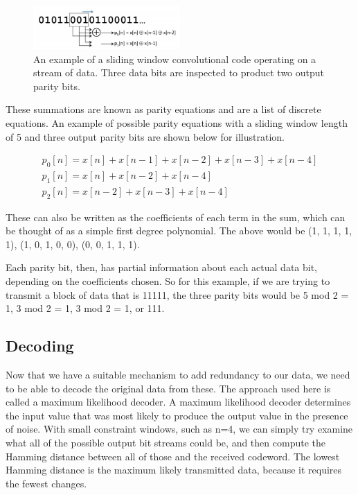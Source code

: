 \documentclass[12pt]{article}
\begin{document}
\begin{figure}[h!]
 \centering
 \includegraphics[width=0.5\textwidth]{img/conv.png}
 \caption{An example of a sliding window convolutional code operating on a stream of data. Three data bits are inspected to product two output parity bits. \cite{mitconv}} 
 \label{fig:conv}
 \end{figure}

These summations are known as parity equations and are a list of discrete equations. An example of possible parity equations with a sliding window length of 5 and three output parity bits are shown below for illustration.

\begin{equation}
  \begin{array}{l}
	p_0[n] = x[n] + x[n-1] + x[n-2] + x[n-3] + x[n-4] \\
	p_1[n] = x[n] + x[n-2] + x[n-4]  \\
	p_2[n] = x[n-2] + x[n-3] + x[n-4]
  \end{array} 
\end{equation}

These can also be written as the coefficients of each term in the sum, which can be thought of as a simple first degree polynomial. The above would be (1, 1, 1, 1, 1), (1, 0, 1, 0, 0), (0, 0, 1, 1, 1).

Each parity bit, then, has partial information about each actual data bit, depending on the coefficients chosen. So for this example, if we are trying to transmit a block of data that is 11111, the three parity bits would be 5 mod 2 = 1, 3 mod 2 = 1, 3 mod 2 = 1, or 111. \cite{rsg}

\subsection{Decoding}

Now that we have a suitable mechanism to add redundancy to our data, we need to be able to decode the original data from these. The approach used here is called a maximum likelihood decoder. A maximum likelihood decoder determines the input value that was most likely to produce the output value in the presence of noise. With small constraint windows, such as n=4, we can simply try examine what all of the possible output bit streams could be, and then compute the Hamming distance between all of those and the received codeword. The lowest Hamming distance is the maximum likely transmitted data, because it requires the fewest changes.
\end{document}
